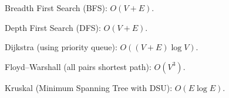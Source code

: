 Breadth First Search (BFS): $O(V+E)$.
\vspace{1mm}

Depth First Search (DFS): $O(V+E)$.
\vspace{1mm}

Dijkstra (using priority queue): $O((V+E)\log V)$.
\vspace{1mm}

Floyd–Warshall (all pairs shortest path): $O(V^3)$.
\vspace{1mm}

Kruskal (Minimum Spanning Tree with DSU): $O(E \log E)$.